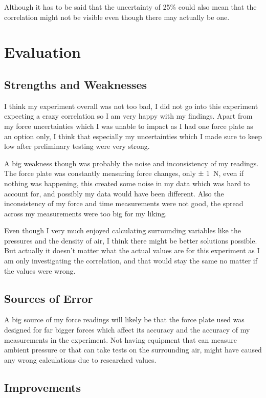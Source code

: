 \documentclass[12pt,a4paper]{article}
\begin{document}
Although it has to be said that the uncertainty of 25\% could also mean that the correlation might not be visible even though there may actually be one.

\section{Evaluation}

\subsection{Strengths and Weaknesses}

I think my experiment overall was not too bad, I did not go into this experiment expecting a crazy correlation so I am very happy with my findings. Apart from my force uncertainties which I was unable to impact as I had one force plate as an option only, I think that especially my uncertainties which I made sure to keep low after preliminary testing were very strong.

A big weakness though was probably the noise and inconsistency of my readings. The force plate was constantly measuring force changes, only ± \SI{1}{\newton}, even if nothing was happening, this created some noise in my data which was hard to account for, and possibly my data would have been different. Also the inconsistency of my force and time measurements were not good, the spread across my measurements were too big for my liking.

Even though I very much enjoyed calculating surrounding variables like the pressures and the density of air, I think there might be better solutions possible. But actually it doesn't matter what the actual values are for this experiment as I am only investigating the correlation, and that would stay the same no matter if the values were wrong.

\subsection{Sources of Error}

A big source of my force readings will likely be that the force plate used was designed for far bigger forces which affect its accuracy and the accuracy of my measurements in the experiment. Not having equipment that can measure ambient pressure or that can take tests on the surrounding air, might have caused any wrong calculations due to researched values.

\subsection{Improvements}
\end{document}
